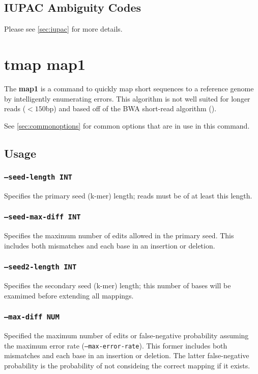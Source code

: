 \documentclass[a4paper,12pt]{book}
\newcommand{\TT}[1]{{\tt #1}} %
\newcommand{\BF}[1]{{\bf #1}} %
\begin{document}
\subsection{IUPAC Ambiguity Codes}
Please see \autoref{sec:iupac} for more details. 

\section{tmap map1}
\label{sec:map1}
The \BF{map1} is a command to quickly map short sequences to a reference genome by intelligently enumerating errors.
This algorithm is not well suited for longer reads ($<150$bp) and based off of the BWA short-read algorithm (\cite{BWA-short}).

See \autoref{sec:commonoptions} for common options that are in use in this command.

\subsection{Usage}

\subsubsection{\TT{--seed-length INT}}
Specifies the primary seed (k-mer) length; reads must be of at least this length.

\subsubsection{\TT{--seed-max-diff INT}}
Specifies the maximum number of edits allowed in the primary seed.
This includes both mismatches and each base in an insertion or deletion. 

\subsubsection{\TT{--seed2-length INT}}
Specifies the secondary seed (k-mer) length; this number of bases will be examimed before extending all mappings.

\subsubsection{\TT{--max-diff NUM}}
Specified the maximum number of edits or false-negative probability assuming the maximum error rate (\TT{--max-error-rate}).
This former includes both mismatches and each base in an insertion or deletion. 
The latter false-negative probability is the probability of not consideing the correct mapping if it exists. 
\end{document}
